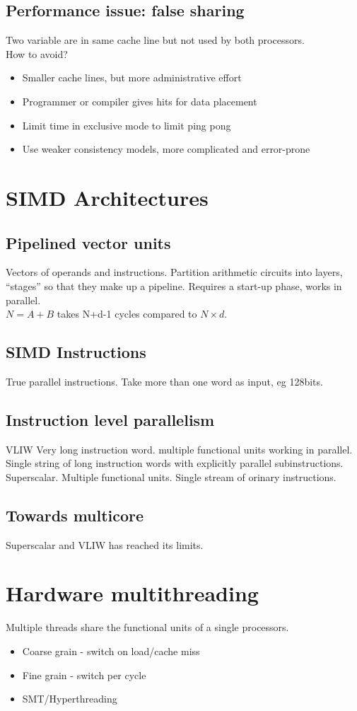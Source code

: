 \documentclass[a4paper]{article}
\begin{document}
\subsection{Performance issue: false sharing}
Two variable are in same cache line but not used by both processors.
\\How to avoid?
\begin{itemize}
    \item Smaller cache lines, but more administrative effort
    \item Programmer or compiler gives hits for data placement
    \item Limit time in exclusive mode to limit ping pong
    \item Use weaker consistency models, more complicated and error-prone
\end{itemize}
\section{SIMD Architectures}
\subsection{Pipelined vector units}
Vectors of operands and instructions. Partition arithmetic circuits into layers, ``stages''
so that they make up a pipeline.
Requires a start-up phase, works in parallel. 
\\$N=A+B$ takes N+d-1 cycles compared to $N\times d$.
\subsection{SIMD Instructions}
True parallel instructions. Take more than one word as input, eg 128bits.
\subsection{Instruction level parallelism}
VLIW Very long instruction word. multiple functional units working in parallel.
Single string of long instruction words with explicitly parallel subinstructions.
\\
Superscalar. Multiple functional units. Single stream of orinary instructions.
\subsection{Towards multicore}
Superscalar and VLIW has reached its limits.
\section{Hardware multithreading}
Multiple threads share the functional units of a single processors.
\begin{itemize}
    \item Coarse grain - switch on load/cache miss
    \item Fine grain - switch per cycle
    \item SMT/Hyperthreading
\end{itemize}
\end{document}
